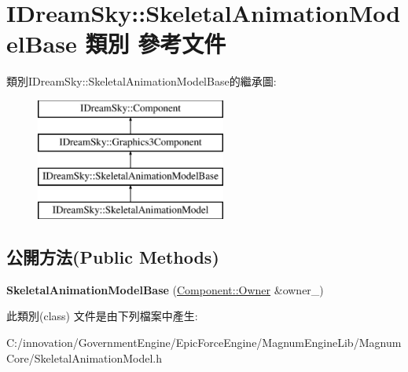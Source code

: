 \hypertarget{class_i_dream_sky_1_1_skeletal_animation_model_base}{}\section{I\+Dream\+Sky\+:\+:Skeletal\+Animation\+Model\+Base 類別 參考文件}
\label{class_i_dream_sky_1_1_skeletal_animation_model_base}
類別\+I\+Dream\+Sky\+:\+:Skeletal\+Animation\+Model\+Base的繼承圖\+:\begin{figure}[H]
\begin{center}
\leavevmode
\includegraphics[height=4.000000cm]{class_i_dream_sky_1_1_skeletal_animation_model_base}
\end{center}
\end{figure}
\subsection*{公開方法(Public Methods)}
\begin{DoxyCompactItemize}
\item 
{\bfseries Skeletal\+Animation\+Model\+Base} (\hyperlink{class_i_dream_sky_1_1_component_1_1_owner}{Component\+::\+Owner} \&owner\+\_\+)\hypertarget{class_i_dream_sky_1_1_skeletal_animation_model_base_a0a44ba27ca8d20a01b1e4fd9f7d42949}{}\label{class_i_dream_sky_1_1_skeletal_animation_model_base_a0a44ba27ca8d20a01b1e4fd9f7d42949}

\end{DoxyCompactItemize}


此類別(class) 文件是由下列檔案中產生\+:\begin{DoxyCompactItemize}
\item 
C\+:/innovation/\+Government\+Engine/\+Epic\+Force\+Engine/\+Magnum\+Engine\+Lib/\+Magnum\+Core/Skeletal\+Animation\+Model.\+h\end{DoxyCompactItemize}

